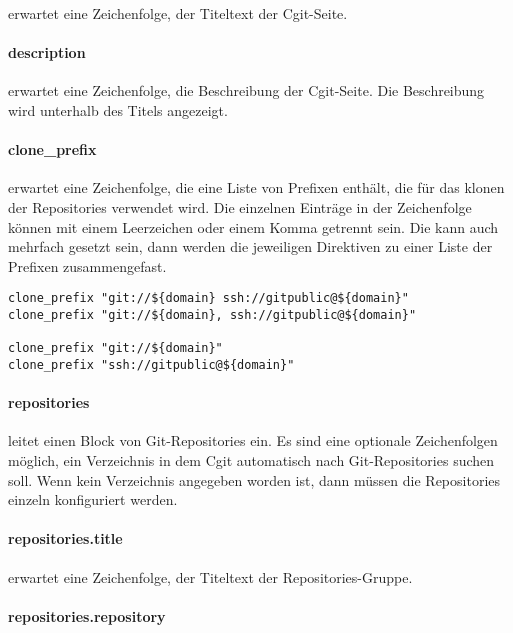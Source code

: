  erwartet eine Zeichenfolge, der Titeltext der Cgit-Seite.

\paragraph{description}

 erwartet eine Zeichenfolge, die Beschreibung der Cgit-Seite. Die Beschreibung wird unterhalb des Titels angezeigt.

\paragraph{clone\_prefix}

 erwartet eine Zeichenfolge, die eine Liste von Prefixen enthält, die für das klonen der Repositories verwendet wird. Die einzelnen Einträge in der Zeichenfolge können mit einem Leerzeichen oder einem Komma getrennt sein. Die  kann auch mehrfach gesetzt sein, dann werden die jeweiligen Direktiven zu einer Liste der Prefixen zusammengefast.

\begin{lstlisting}[style=Java, caption=Beispiele für die \directive{clone\_prefix}]
clone_prefix "git://${domain} ssh://gitpublic@${domain}"
clone_prefix "git://${domain}, ssh://gitpublic@${domain}"

clone_prefix "git://${domain}"
clone_prefix "ssh://gitpublic@${domain}"
\end{lstlisting}

\paragraph{repositories}

 leitet einen Block von Git-Repositories ein. Es sind eine optionale Zeichenfolgen möglich, ein Verzeichnis in dem Cgit automatisch nach Git-Repositories suchen soll. Wenn kein Verzeichnis angegeben worden ist, dann müssen die Repositories einzeln konfiguriert werden.

\paragraph{repositories.title}

 erwartet eine Zeichenfolge, der Titeltext der Repositories-Gruppe.

\paragraph{repositories.repository}

